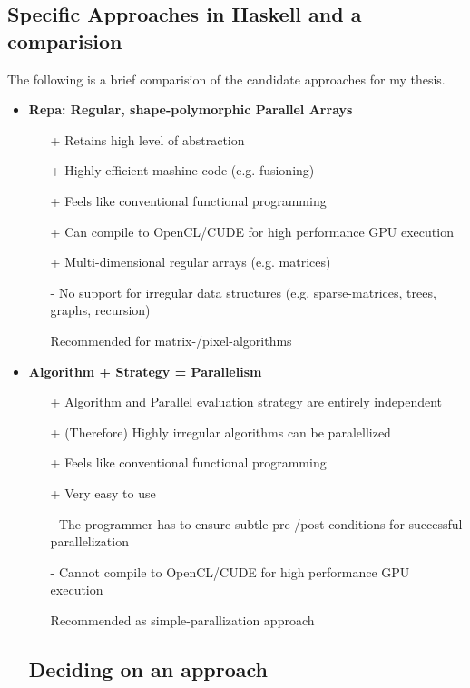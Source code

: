 \documentclass{article}
\begin{document}
    \subsection{Specific Approaches in Haskell and a comparision}
    The following is a brief comparision of the candidate approaches for my thesis.
    \begin{itemize}
    \item \textbf{Repa: Regular, shape-polymorphic Parallel Arrays}
        \begin{itemize}
            \item[+] Retains high level of abstraction
            \item[+] Highly efficient mashine-code (e.g. fusioning)
            \item[+] Feels like conventional functional programming
            \item[+] Can compile to OpenCL/CUDE for high performance GPU execution
            \item[+] Multi-dimensional regular arrays (e.g. matrices)
            \item[-] No support for irregular data structures (e.g. sparse-matrices, trees, graphs, recursion)
            \item[\textbullet] Recommended for matrix-/pixel-algorithms
        \end{itemize}

    \item \textbf{ Algorithm + Strategy = Parallelism}
        \begin{itemize}
            \item[+] Algorithm and Parallel evaluation strategy are entirely independent
            \item[+] (Therefore) Highly irregular algorithms can be paralellized
            \item[+] Feels like conventional functional programming
            \item[+] Very easy to use
            \item[-] The programmer has to ensure subtle pre-/post-conditions for successful parallelization
            \item[-] Cannot compile to OpenCL/CUDE for high performance GPU execution
            \item[\textbullet] Recommended as simple-parallization approach
        \end{itemize}



    \subsection{Deciding on an approach}


\end{itemize}
\end{document}
